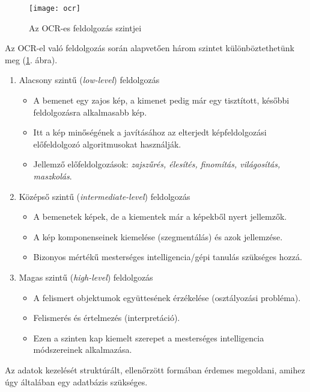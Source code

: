\begin{figure}[h]
\texttt{[image: ocr]}
\centering
\caption{Az OCR-es feldolgozás szintjei}
\label{fig:feldolgozasi_szintek}
\end{figure}

Az OCR-el való feldolgozás során alapvetően három szintet különböztethetünk meg (\ref{fig:feldolgozasi_szintek}. ábra).

\begin{enumerate}
\item Alacsony szintű (\textit{low-level}) feldolgozás
	\begin{itemize}
	\item A bemenet egy zajos kép, a kimenet pedig már egy tisztított, későbbi feldolgozásra alkalmasabb kép.
	\item Itt a kép minőségének a javításához az elterjedt képfeldolgozási előfeldolgozó algoritmusokat használják.
	\item Jellemző előfeldolgozások: \textit{zajszűrés, élesítés, finomítás, világosítás, maszkolás}.
	\end{itemize}
\item Középső szintű (\textit{intermediate-level}) feldolgozás
	\begin{itemize}
	\item A bemenetek képek, de a kiementek már a képekből nyert jellemzők.
	\item A kép komponenseinek kiemelése (szegmentálás) és azok jellemzése.
	\item Bizonyos mértékű mesterséges intelligencia/gépi tanulás szükséges hozzá.
	\end{itemize}
\item Magas szintű (\textit{high-level}) feldolgozás
	\begin{itemize}
	\item A felismert objektumok együttesének érzékelése (osztályozási probléma).
	\item Felismerés és értelmezés (interpretáció).
	\item Ezen a szinten kap kiemelt szerepet a mesterséges intelligencia módszereinek alkalmazása.
	\end{itemize}
\end{enumerate}

Az adatok kezelését struktúrált, ellenőrzött formában érdemes megoldani, amihez úgy általában egy adatbázis szükséges.

